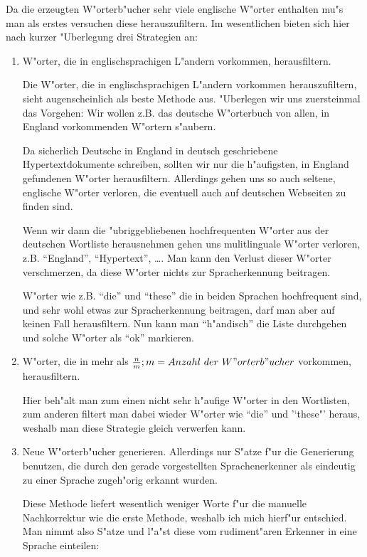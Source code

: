 Da die erzeugten W"orterb"ucher sehr viele englische W"orter enthalten mu"s man als erstes versuchen diese herauszufiltern. Im wesentlichen bieten sich hier nach kurzer "Uberlegung drei Strategien an:
\begin{enumerate}
\item W"orter, die in englischsprachigen L"andern vorkommen, herausfiltern.

Die W"orter, die in englischsprachigen L"andern vorkommen herauszufiltern, sieht augenscheinlich als beste Methode aus. "Uberlegen wir uns zuersteinmal das Vorgehen: Wir wollen z.B. das deutsche W"orterbuch von allen, in England vorkommenden W"ortern s"aubern.

Da sicherlich Deutsche in England in deutsch geschriebene Hypertextdokumente schreiben, sollten wir nur die h"aufigsten, in England gefundenen W"orter herausfiltern. Allerdings gehen uns so auch seltene, englische W"orter verloren, die eventuell auch auf deutschen Webseiten zu finden sind.

Wenn wir dann die "ubriggebliebenen hochfrequenten W"orter aus der deutschen Wortliste herausnehmen gehen uns mulitlinguale W"orter verloren, z.B. "`England"', "`Hypertext"', \dots . Man kann den Verlust dieser W"orter verschmerzen, da diese W"orter nichts zur Spracherkennung beitragen.

W"orter wie z.B. "`die"' und "`these"' die in beiden Sprachen hochfrequent sind, und sehr wohl etwas zur Spracherkennung beitragen, darf man aber auf keinen Fall herausfiltern. Nun kann man "`h"andisch"' die Liste durchgehen und solche W"orter als "`ok"' markieren.


\item W"orter, die in mehr als $\frac{n}{m}; m=Anzahl\ der\ W"orterb"ucher$ vorkommen, herausfiltern.

Hier beh"alt man zum einen nicht sehr h"aufige W"orter in den Wortlisten, zum anderen filtert man dabei wieder W"orter wie "`die"' und '`these"' heraus, weshalb man diese Strategie gleich verwerfen kann.


\item Neue W"orterb"ucher generieren. Allerdings nur S"atze f"ur die Generierung benutzen, die durch den gerade vorgestellten Sprachenerkenner als eindeutig zu einer Sprache zugeh"orig erkannt wurden.

Diese Methode liefert wesentlich weniger Worte f"ur die manuelle Nachkorrektur wie die erste Methode, weshalb ich mich hierf"ur entschied. Man nimmt also S"atze und l"a"st diese vom rudiment"aren Erkenner in eine Sprache einteilen:


\end{enumerate}
